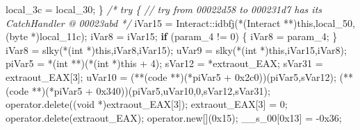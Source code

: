 \documentclass[
]{article}
\newenvironment{Shaded}{}{}
\newcommand{\BaseNTok}[1]{\textcolor[rgb]{0.25,0.63,0.44}{#1}}
\newcommand{\CommentTok}[1]{\textcolor[rgb]{0.38,0.63,0.69}{\textit{#1}}}
\newcommand{\ControlFlowTok}[1]{\textcolor[rgb]{0.00,0.44,0.13}{\textbf{#1}}}
\newcommand{\DataTypeTok}[1]{\textcolor[rgb]{0.56,0.13,0.00}{#1}}
\newcommand{\DecValTok}[1]{\textcolor[rgb]{0.25,0.63,0.44}{#1}}
\newcommand{\NormalTok}[1]{#1}
\newcommand{\OperatorTok}[1]{\textcolor[rgb]{0.40,0.40,0.40}{#1}}
\begin{document}
\begin{Shaded}
\begin{Highlighting}[]
\NormalTok{    local\_3c }\OperatorTok{=}\NormalTok{ local\_30}\OperatorTok{;}
  \OperatorTok{\}}
                    \CommentTok{/* try \{ // try from 00022d58 to 000231d7 has its CatchHandler @ 00023abd */}
\NormalTok{  iVar15 }\OperatorTok{=}\NormalTok{ Interact}\OperatorTok{::}\NormalTok{idbfj}\OperatorTok{(*(}\NormalTok{Interact }\OperatorTok{**)}\NormalTok{this}\OperatorTok{,}\NormalTok{local\_50}\OperatorTok{,(}\NormalTok{byte }\OperatorTok{*)}\NormalTok{local\_11c}\OperatorTok{);}
\NormalTok{  iVar8 }\OperatorTok{=}\NormalTok{ iVar15}\OperatorTok{;}
  \ControlFlowTok{if} \OperatorTok{(}\NormalTok{param\_4 }\OperatorTok{!=} \DecValTok{0}\OperatorTok{)} \OperatorTok{\{}
\NormalTok{    iVar8 }\OperatorTok{=}\NormalTok{ param\_4}\OperatorTok{;}
  \OperatorTok{\}}
\NormalTok{  iVar8 }\OperatorTok{=}\NormalTok{ slky}\OperatorTok{(*(}\DataTypeTok{int} \OperatorTok{*)}\NormalTok{this}\OperatorTok{,}\NormalTok{iVar8}\OperatorTok{,}\NormalTok{iVar15}\OperatorTok{);}
\NormalTok{  uVar9 }\OperatorTok{=}\NormalTok{ slky}\OperatorTok{(*(}\DataTypeTok{int} \OperatorTok{*)}\NormalTok{this}\OperatorTok{,}\NormalTok{iVar15}\OperatorTok{,}\NormalTok{iVar8}\OperatorTok{);}
\NormalTok{  piVar5 }\OperatorTok{=} \OperatorTok{*(}\DataTypeTok{int} \OperatorTok{**)(*(}\DataTypeTok{int} \OperatorTok{*)}\NormalTok{this }\OperatorTok{+} \DecValTok{4}\OperatorTok{);}
\NormalTok{  sVar12 }\OperatorTok{=} \OperatorTok{*}\NormalTok{extraout\_EAX}\OperatorTok{;}
\NormalTok{  sVar31 }\OperatorTok{=}\NormalTok{ extraout\_EAX}\OperatorTok{[}\DecValTok{3}\OperatorTok{];}
\NormalTok{  uVar10 }\OperatorTok{=} \OperatorTok{(**(}\NormalTok{code }\OperatorTok{**)(*}\NormalTok{piVar5 }\OperatorTok{+} \BaseNTok{0x2c0}\OperatorTok{))(}\NormalTok{piVar5}\OperatorTok{,}\NormalTok{sVar12}\OperatorTok{);}
  \OperatorTok{(**(}\NormalTok{code }\OperatorTok{**)(*}\NormalTok{piVar5 }\OperatorTok{+} \BaseNTok{0x340}\OperatorTok{))(}\NormalTok{piVar5}\OperatorTok{,}\NormalTok{uVar10}\OperatorTok{,}\DecValTok{0}\OperatorTok{,}\NormalTok{sVar12}\OperatorTok{,}\NormalTok{sVar31}\OperatorTok{);}
\NormalTok{  operator}\OperatorTok{.}\NormalTok{delete}\OperatorTok{((}\DataTypeTok{void} \OperatorTok{*)}\NormalTok{extraout\_EAX}\OperatorTok{[}\DecValTok{3}\OperatorTok{]);}
\NormalTok{  extraout\_EAX}\OperatorTok{[}\DecValTok{3}\OperatorTok{]} \OperatorTok{=} \DecValTok{0}\OperatorTok{;}
\NormalTok{  operator}\OperatorTok{.}\NormalTok{delete}\OperatorTok{(}\NormalTok{extraout\_EAX}\OperatorTok{);}
\NormalTok{  operator}\OperatorTok{.}\NormalTok{new}\OperatorTok{[](}\BaseNTok{0x15}\OperatorTok{);}
\NormalTok{  \_\_s\_00}\OperatorTok{[}\BaseNTok{0x13}\OperatorTok{]} \OperatorTok{=} \OperatorTok{{-}}\BaseNTok{0x36}\OperatorTok{;}

\end{Highlighting}
\end{Shaded}
\end{document}
